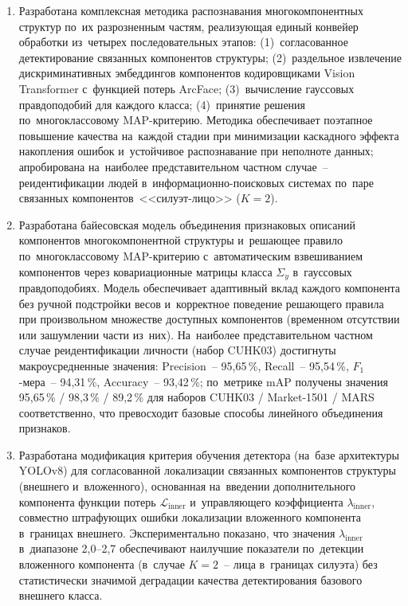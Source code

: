 \begin{enumerate}
  \item Разработана комплексная методика распознавания многокомпонентных
        структур по~их разрозненным частям, реализующая единый конвейер
        обработки из~четырех последовательных этапов: (1)~согласованное
        детектирование связанных компонентов структуры; (2)~раздельное
        извлечение дискриминативных эмбеддингов компонентов кодировщиками
        Vision Transformer с~функцией потерь ArcFace; (3)~вычисление
        гауссовых правдоподобий для каждого класса; (4)~принятие решения
        по~многоклассовому MAP-критерию. Методика обеспечивает поэтапное
        повышение качества на~каждой стадии при минимизации каскадного
        эффекта накопления ошибок и~устойчивое распознавание при неполноте
        данных; апробирована на~наиболее представительном частном случае~--
        реидентификации людей в~информационно-поисковых системах по~паре
        связанных компонентов~<<силуэт-лицо>> ($K=2$).

  \item Разработана байесовская модель объединения признаковых описаний
        компонентов многокомпонентной структуры и~решающее правило
        по~многоклассовому MAP-критерию с~автоматическим взвешиванием
        компонентов через ковариационные матрицы класса $\Sigma_y$
        в~гауссовых правдоподобиях. Модель обеспечивает адаптивный вклад
        каждого компонента без ручной подстройки весов и~корректное
        поведение решающего правила при произвольном множестве доступных
        компонентов (временном отсутствии или зашумлении части из~них).
        На~наиболее представительном частном случае реидентификации
        личности (набор CUHK03) достигнуты макроусредненные значения:
        Precision~-- 95,65\,\%, Recall~-- 95,54\,\%, $F_1$-мера~-- 94,31\,\%,
        Accuracy~-- 93,42\,\%; по~метрике mAP получены значения 95,65\,\% /
        98,3\,\% / 89,2\,\% для наборов CUHK03 / Market-1501 / MARS
        соответственно, что превосходит базовые способы линейного
        объединения признаков.

  \item Разработана модификация критерия обучения детектора (на~базе
        архитектуры YOLOv8) для согласованной локализации связанных
        компонентов структуры (внешнего и~вложенного), основанная
        на~введении дополнительного компонента функции потерь
        $\mathcal{L}_{\text{inner}}$ и~управляющего коэффициента
        $\lambda_{\text{inner}}$, совместно штрафующих ошибки локализации
        вложенного компонента в~границах внешнего. Экспериментально
        показано, что значения $\lambda_{\text{inner}}$ в~диапазоне
        2,0--2,7 обеспечивают наилучшие показатели по~детекции вложенного
        компонента (в~случае $K=2$~-- лица в~границах силуэта) без
        статистически значимой деградации качества детектирования базового
        внешнего класса.


\end{enumerate}
